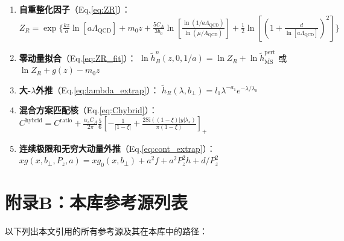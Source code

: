 \documentclass[12pt,a4paper]{ctexart}
\theoremstyle{definition}
\newcommand{\MS}{\overline{\text{MS}}}
\newcommand{\hB}{\tilde{h}_B}
\newcommand{\hR}{\tilde{h}_R}
\newcommand{\hpert}{\tilde{h}^{\text{pert}}}
\newcommand{\Pz}{P_z}
\newcommand{\QCD}{\Lambda_{\text{QCD}}}
\newcommand{\alphas}{\alpha_s}
\newcommand{\CA}{C_A}
\newcommand{\bperp}{b_\perp}
\begin{document}
\begin{enumerate}[label=(A\arabic*), leftmargin=*]
    \item \textbf{自重整化因子}（Eq.\ref{eq:ZR}）：
    $Z_R = \exp\{\frac{kz}{a}\ln[a\QCD] + m_0 z + \frac{5\CA}{3b_0} \ln[\frac{\ln(1/a\QCD)}{\ln(\mu/\QCD)}] + \frac{1}{2}\ln[(1+\frac{d}{\ln[a\QCD]})^2]\}$

    \item \textbf{零动量拟合}（Eq.\ref{eq:ZR_fit}）：
    $\ln \hB^n(z, 0, 1/a) = \ln Z_R + \ln \hpert_{\MS}$ 或 $\ln Z_R + g(z) - m_0 z$

    \item \textbf{大-$\lambda$外推}（Eq.\ref{eq:lambda_extrap}）：
    $\hR(\lambda, \bperp) = l_1 \lambda^{-a_1} e^{-\lambda/\lambda_0}$

    \item \textbf{混合方案匹配核}（Eq.\ref{eq:Chybrid}）：
    $C^{\text{hybrid}} = C^{\text{ratio}} + \frac{\alphas \CA}{2\pi} \frac{5}{6} [-\frac{1}{|1-\xi|} + \frac{2\text{Si}((1-\xi)|y|\lambda_s)}{\pi(1-\xi)}]_+$

    \item \textbf{连续极限和无穷大动量外推}（Eq.\ref{eq:cont_extrap}）：
    $x g(x, \bperp, \Pz, a) = x g_0(x, \bperp) + a^2 f + a^2 \Pz^2 h + d/\Pz^2$
\end{enumerate}


\section*{附录B：本库参考源列表}

以下列出本文引用的所有参考源及其在本库中的路径：
\end{document}
